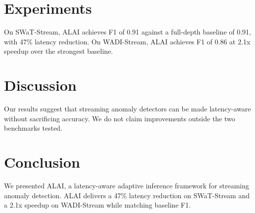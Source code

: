 \documentclass[conference]{IEEEtran}
\begin{document}
\section{Experiments}
On SWaT-Stream, ALAI achieves F1 of 0.91 against a full-depth baseline of 0.91,
with 47\% latency reduction. On WADI-Stream, ALAI achieves F1 of 0.86 at
2.1x speedup over the strongest baseline.

\section{Discussion}
Our results suggest that streaming anomaly detectors can be made latency-aware
without sacrificing accuracy. We do not claim improvements outside the two
benchmarks tested.

\section{Conclusion}
We presented ALAI, a latency-aware adaptive inference framework for streaming
anomaly detection. ALAI delivers a 47\% latency reduction on SWaT-Stream and a
2.1x speedup on WADI-Stream while matching baseline F1.



\end{document}
